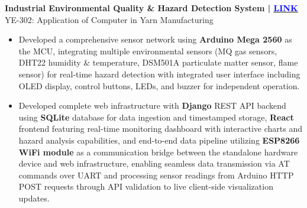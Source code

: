 \noindent
{\noindent\fontsize{12pt}{15pt}\bfseries Industrial Environmental Quality \& Hazard Detection System | \href{https://github.com/humam-hossain/arduino-env-hazard.git}{\underline{\textcolor{blue}{LINK}}}} \\
{\fontsize{9pt}{11pt}YE-302: Application of Computer in Yarn Manufacturing}
\begin{itemize}[leftmargin=1em, itemsep=0.1em, labelsep=0.5em]
    \item Developed a comprehensive sensor network using \textbf{Arduino Mega 2560} as the MCU, integrating multiple environmental sensors (MQ gas sensors, DHT22 humidity \& temperature, DSM501A particulate matter sensor, flame sensor) for real-time hazard detection with integrated user interface including OLED display, control buttons, LEDs, and buzzer for independent operation.

    \item Developed complete web infrastructure with \textbf{Django} REST API backend using \textbf{SQLite} database for data ingestion and timestamped storage, \textbf{React} frontend featuring real-time monitoring dashboard with interactive charts and hazard analysis capabilities, and end-to-end data pipeline utilizing \textbf{ESP8266 WiFi module} as a communication bridge between the standalone hardware device and web infrastructure, enabling seamless data transmission via AT commands over UART and processing sensor readings from Arduino HTTP POST requests through API validation to live client-side visualization updates.
\end{itemize}